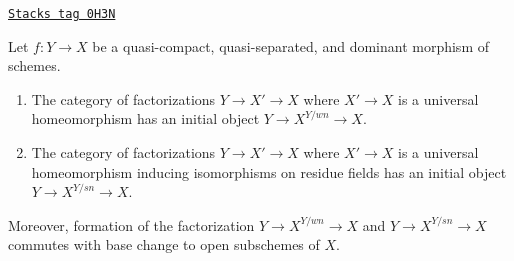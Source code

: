\begin{lemma}
\label{morphisms-lemma-relative-seminormalization}
\href{https://stacks.math.columbia.edu/tag/0H3N}{\texttt{Stacks tag 0H3N}}

Let $f : Y \to X$ be a quasi-compact, quasi-separated, and dominant
morphism of schemes.
\begin{enumerate}
\item The category of factorizations $Y \to X' \to X$ where $X' \to X$
is a universal homeomorphism has an initial object $Y \to X^{Y/wn} \to X$.
\item The category of factorizations $Y \to X' \to X$ where $X' \to X$
is a universal homeomorphism inducing isomorphisms on residue fields
has an initial object $Y \to X^{Y/sn} \to X$.
\end{enumerate}
Moreover, formation of the factorization $Y \to X^{Y/wn} \to X$ and
$Y \to X^{Y/sn} \to X$ commutes with base change to open subschemes of $X$.
\end{lemma}

